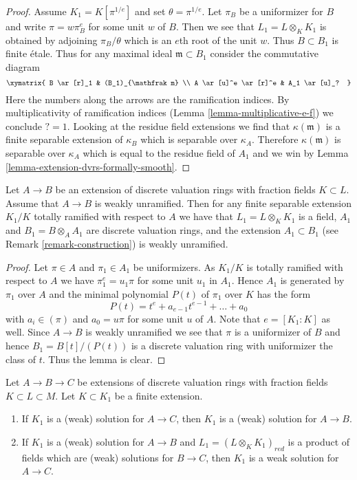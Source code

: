 \begin{proof}
\medskip\noindent
Assume $K_1 = K[\pi^{1/e}]$ and set $\theta = \pi^{1/e}$. Let $\pi_B$ be a
uniformizer for $B$ and write $\pi = w \pi_B^e$ for some unit $w$ of $B$.
Then we see that $L_1 = L \otimes_K K_1$ is obtained by adjoining
$\pi_B/\theta$ which is an $e$th root of the unit $w$. Thus
$B \subset B_1$ is finite \'etale. Thus for any maximal ideal
$\mathfrak m \subset B_1$ consider the commutative diagram
$$
\xymatrix{
B \ar[r]_1 & (B_1)_{\mathfrak m} \\
A \ar[u]^e \ar[r]^e & A_1 \ar[u]_?
}
$$
Here the numbers along the arrows are the ramification indices.
By multiplicativity of ramification indices
(Lemma \ref{lemma-multiplicative-e-f})
we conclude $? = 1$. Looking at the residue field extensions
we find that $\kappa(\mathfrak m)$ is a finite separable extension
of $\kappa_B$ which is separable over $\kappa_A$. Therefore
$\kappa(\mathfrak m)$ is separable over $\kappa_A$
which is equal to the residue field of $A_1$ and we win by
Lemma \ref{lemma-extension-dvrs-formally-smooth}.
\end{proof}

\begin{lemma}
\label{lemma-weakly-unramified-goes-up-along-totally-ramified}
Let $A \to B$ be an extension of discrete valuation rings with fraction
fields $K \subset L$. Assume that $A \to B$ is weakly unramified. Then for
any finite separable extension $K_1/K$ totally ramified with respect to $A$
we have that $L_1 = L \otimes_K K_1$ is a field, $A_1$ and
$B_1 = B \otimes_A A_1$ are discrete valuation rings, and the extension
$A_1 \subset B_1$ (see
Remark \ref{remark-construction}) is weakly unramified.
\end{lemma}

\begin{proof}
Let $\pi \in A$ and $\pi_1 \in A_1$ be uniformizers. As $K_1/K$
is totally ramified with respect to $A$
we have $\pi_1^e = u_1 \pi$ for some unit $u_1$ in $A_1$.
Hence $A_1$ is generated by $\pi_1$ over $A$ and the minimal polynomial
$P(t)$ of $\pi_1$ over $K$ has the form
$$
P(t) = t^e + a_{e - 1} t^{e - 1} + \ldots + a_0
$$
with $a_i \in (\pi)$ and $a_0 = u\pi$ for some unit $u$ of $A$.
Note that $e = [K_1 : K]$ as well. Since $A \to B$ is weakly
unramified we see that $\pi$ is a uniformizer of $B$ and hence
$B_1 = B[t]/(P(t))$ is a discrete valuation ring with uniformizer
the class of $t$. Thus the lemma is clear.
\end{proof}

\begin{lemma}
\label{lemma-solutions-go-down}
Let $A \to B \to C$ be extensions of discrete valuation rings with fraction
fields $K \subset L \subset M$. Let $K \subset K_1$ be a finite extension.
\begin{enumerate}
\item If $K_1$ is a (weak) solution for $A \to C$, then $K_1$ is a (weak)
solution for $A \to B$.
\item If $K_1$ is a (weak) solution for $A \to B$ and
$L_1 = (L \otimes_K K_1)_{red}$ is a product of fields which are
(weak) solutions for $B \to C$, then $K_1$ is a weak solution for $A \to C$.
\end{enumerate}
\end{lemma}

